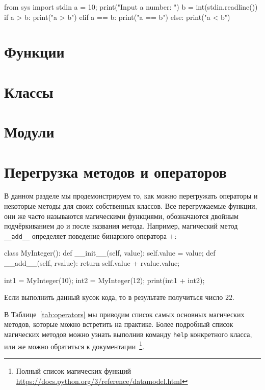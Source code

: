 \begin{python}
from sys import stdin
a = 10;
print("Input a number: ")
b = int(stdin.readline())
if a > b:
	print("a > b")
elif a == b:
	print("a == b")
else:
	print("a < b")
\end{python}

\section{Функции}

\section{Классы}

\section{Модули}

\section{Перегрузка методов и операторов}

В данном разделе мы продемонстрируем то, как можно перегружать
операторы и некоторые методы для своих собственных классов. 
Все перегружаемые функции, они же часто называются магическими 
функциями, обозначаются двойным подчёркиванием до и после 
названия метода. Например, магический метод \texttt{\_\_add\_\_} 
определяет поведение бинарного оператора $+$:

\begin{python}
class MyInteger():
	def __init__(self, value):
		self.value = value;
	def __add__(self, rvalue):
		return self.value + rvalue.value;

int1 = MyInteger(10);
int2 = MyInteger(12);
print(int1 + int2);
\end{python}

Если выполнить данный кусок кода, то в результате получиться число $22$.

В Таблице~\ref{tab:operators} мы приводим список самых основных магических 
методов, которые можно встретить на практике. Более подробный список магических 
методов можно узнать выполнив команду \texttt{help} конкретного класса,
или же можно обратиться к документации~\footnote{Полный список магических 
функций \url{https://docs.python.org/3/reference/datamodel.html}}.

